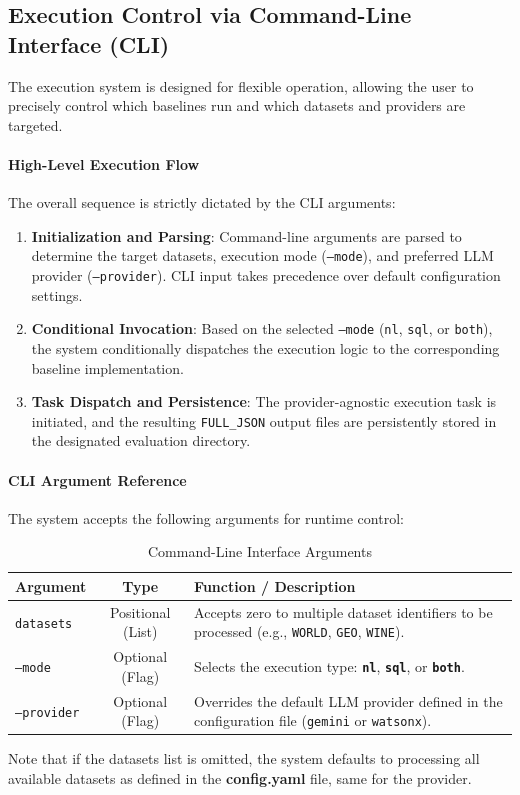 \subsection{Execution Control via Command-Line Interface (CLI)}

The execution system is designed for flexible operation, allowing the user to precisely control which baselines run and which datasets and providers are targeted.

\paragraph{\textbf{High-Level Execution Flow}}
The overall sequence is strictly dictated by the CLI arguments:
\begin{enumerate}[leftmargin=*, label=\arabic*.]
    \item \textbf{Initialization and Parsing}: Command-line arguments are parsed to determine the target datasets, execution mode (\texttt{--mode}), and preferred LLM provider (\texttt{--provider}). CLI input takes precedence over default configuration settings.
    \item \textbf{Conditional Invocation}: Based on the selected \texttt{--mode} (\texttt{nl}, \texttt{sql}, or \texttt{both}), the system conditionally dispatches the execution logic to the corresponding baseline implementation.
    \item \textbf{Task Dispatch and Persistence}: The provider-agnostic execution task is initiated, and the resulting \texttt{FULL\_JSON} output files are persistently stored in the designated evaluation directory.
\end{enumerate}

\paragraph{\textbf{CLI Argument Reference}}
The system accepts the following arguments for runtime control:

\begin{table}[H]
    \centering
    \label{tab:cli-arguments}
    \begin{tabular}{l c p{}}
        \toprule
        \textbf{Argument} & \textbf{Type} & \textbf{Function / Description} \\
        \midrule
        \texttt{datasets} & Positional (List) & Accepts zero to multiple dataset identifiers to be processed (e.g., \texttt{WORLD}, \texttt{GEO}, \texttt{WINE}). \\
        \texttt{--mode} & Optional (Flag) & Selects the execution type: \textbf{\texttt{nl}}, \textbf{\texttt{sql}}, or \textbf{\texttt{both}}. \\
        \texttt{--provider} & Optional (Flag) & Overrides the default LLM provider defined in the configuration file (\texttt{gemini} or \texttt{watsonx}). \\
        \bottomrule
    \end{tabular}
    \caption{Command-Line Interface Arguments}
\end{table}

\noindent
Note that if the datasets list is omitted, the system defaults to processing all available datasets as defined in the \textbf{config.yaml} file, same for the provider.

